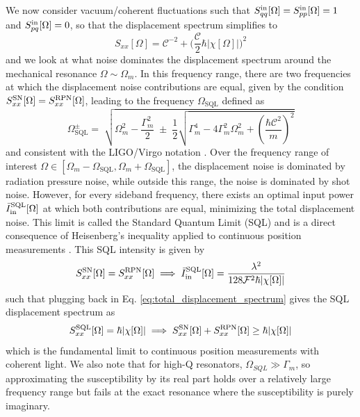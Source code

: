 We now consider vacuum/coherent fluctuations such that $S_{qq}^{\rm in}[\Omega]=S_{pp}^{\rm in}[\Omega]=1$ and $S_{pq}^{\rm in}[\Omega]=0$, so that the displacement spectrum simplifies to
\begin{equation}
  S_{xx}[\Omega] = \mathcal{C}^{-2}  + \bigg(\dfrac{\mathcal{C} }{2} \hbar |\chi[\Omega]| \bigg)^2
  \label{eq:total_displacement_spectrum}
\end{equation}
and we look at what noise dominates the displacement spectrum around the mechanical resonance $\Omega \sim \Omega_m$. In this frequency range, there are two frequencies at which the displacement noise contributions are equal, given by the condition $S_{xx}^{\rm SN}[\Omega] = S_{xx}^{\rm RPN}[\Omega]$, leading to the frequency $\Omega_{\text{SQL}}$ defined as
\begin{equation}
  \Omega^{\pm}_{\text{SQL}}  =\;\sqrt{\Omega_m^2-\dfrac{\Gamma_m^2}{2}
\;\pm\;\dfrac{1}{2}\sqrt{\Gamma_m^4-4\Gamma_m^2\Omega_m^2+\left(\frac{\hbar \mathcal{C}^2}{m }\right)^2}}
\end{equation}
and consistent with the LIGO/Virgo notation \cite{klmtv, bch}. Over the frequency range of interest $\Omega \in [\Omega_m - \Omega_{\text{SQL}}, \Omega_m + \Omega_{\text{SQL}}]$, the displacement noise is dominated by radiation pressure noise, while outside this range, the noise is dominated by shot noise. However, for every sideband frequency, there exists an optimal input power $\bar{I}_\mathrm{in}^{\rm SQL}[\Omega]$ at which both contributions are equal, minimizing the total displacement noise. This limit is called the Standard Quantum Limit (SQL) and is a direct consequence of Heisenberg's inequality applied to continuous position measurements \cite{BraginskyKhalili1996_RMP_QND, clerk_introduction_2010}. This SQL intensity is given by
\begin{equation}
  S_{xx}^{\rm SN}[\Omega] = S_{xx}^{\rm RPN}[\Omega] \implies \bar{I}_\mathrm{in}^{\rm SQL}[\Omega] = \dfrac{\lambda^2}{128\mathcal{F}^2 \hbar |\chi[\Omega]|}
\end{equation}
such that plugging back in Eq. \eqref{eq:total_displacement_spectrum} gives the SQL displacement spectrum as
\begin{equation}
  S_{xx}^{\rm SQL}[\Omega] = \hbar |\chi[\Omega]| \implies S_{xx}^{\rm SN}[\Omega] + S_{xx}^{\rm RPN}[\Omega] \geq \hbar |\chi[\Omega]|
\end{equation}
which is the fundamental limit to continuous position measurements with coherent light. We also note that for high-Q resonators, $\Omega_{SQL} \gg \Gamma_m$, so approximating the susceptibility by its real part holds over a relatively large frequency range but fails at the exact resonance where the susceptibility is purely imaginary.
